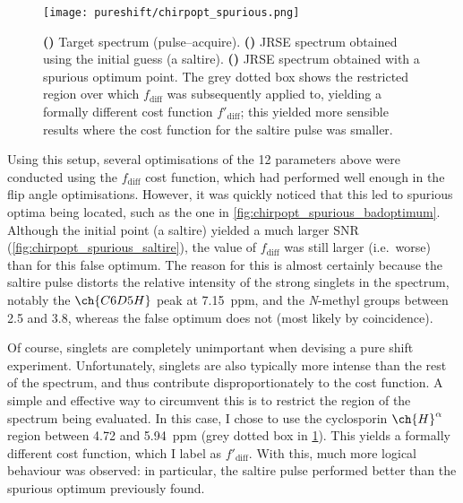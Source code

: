 \begin{figure}[htbp]
    \centering
    \texttt{[image: pureshift/chirpopt\_spurious.png]}%
    {\label{fig:chirpopt_spurious_target}}%
    {\label{fig:chirpopt_spurious_saltire}}%
    {\label{fig:chirpopt_spurious_badoptimum}}%
    \caption[Spurious optimum obtained in waveform optimisation using $f_\text{diff}$]{
        \textbf{()} Target spectrum (pulse--acquire).
        \textbf{()} JRSE spectrum obtained using the initial guess (a saltire).
        \textbf{()} JRSE spectrum obtained with a spurious optimum point.
        The grey dotted box shows the restricted region over which $f_\text{diff}$ was subsequently applied to, yielding a formally different cost function $f'_\text{diff}$; this yielded more sensible results where the cost function for the saltire pulse was smaller.
    }
    \label{fig:chirpopt_spurious}
\end{figure}

Using this setup, several optimisations of the 12 parameters above were conducted using the $f_\text{diff}$ cost function, which had performed well enough in the flip angle optimisations.
However, it was quickly noticed that this led to spurious optima being located, such as the one in \cref{fig:chirpopt_spurious_badoptimum}.
Although the initial point (a saltire) yielded a much larger SNR (\cref{fig:chirpopt_spurious_saltire}), the value of $f_\text{diff}$ was still larger (i.e.\ worse) than for this false optimum.
The reason for this is almost certainly because the saltire pulse distorts the relative intensity of the strong singlets in the spectrum, notably the $\ch{C6D5H}$ peak at \qty{7.15}{ppm}, and the \textit{N}-methyl groups between 2.5 and \qty{3.8}{\ppm}, whereas the false optimum does not (most likely by coincidence).

Of course, singlets are completely unimportant when devising a pure shift experiment.
Unfortunately, singlets are also typically more intense than the rest of the spectrum, and thus contribute disproportionately to the cost function.
A simple and effective way to circumvent this is to restrict the region of the spectrum being evaluated.
In this case, I chose to use the cyclosporin $\ch{H}^{\alpha}$ region between 4.72 and \qty{5.94}{ppm} (grey dotted box in \cref{fig:chirpopt_spurious}).
This yields a formally different cost function, which I label as $f'_\text{diff}$.
With this, much more logical behaviour was observed: in particular, the saltire pulse performed better than the spurious optimum previously found.

